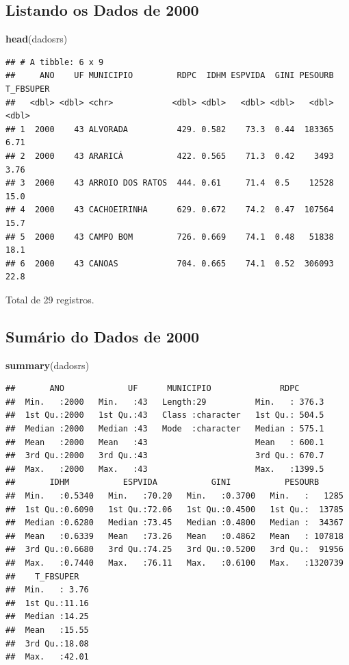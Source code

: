 \documentclass[]{article}
\newenvironment{Shaded}{\begin{snugshade}}{\end{snugshade}}
\newcommand{\KeywordTok}[1]{\textcolor[rgb]{0.13,0.29,0.53}{\textbf{#1}}}
\newcommand{\NormalTok}[1]{#1}
\begin{document}
\subsection{Listando os Dados de 2000}\label{listando-os-dados-de-2000}

\begin{Shaded}
\begin{Highlighting}[]
\KeywordTok{head}\NormalTok{(dadosrs)}
\end{Highlighting}
\end{Shaded}

\begin{verbatim}
## # A tibble: 6 x 9
##     ANO    UF MUNICIPIO         RDPC  IDHM ESPVIDA  GINI PESOURB T_FBSUPER
##   <dbl> <dbl> <chr>            <dbl> <dbl>   <dbl> <dbl>   <dbl>     <dbl>
## 1  2000    43 ALVORADA          429. 0.582    73.3  0.44  183365      6.71
## 2  2000    43 ARARICÁ           422. 0.565    71.3  0.42    3493      3.76
## 3  2000    43 ARROIO DOS RATOS  444. 0.61     71.4  0.5    12528     15.0 
## 4  2000    43 CACHOEIRINHA      629. 0.672    74.2  0.47  107564     15.7 
## 5  2000    43 CAMPO BOM         726. 0.669    74.1  0.48   51838     18.1 
## 6  2000    43 CANOAS            704. 0.665    74.1  0.52  306093     22.8
\end{verbatim}

Total de 29 registros.

\subsection{Sumário do Dados de 2000}\label{sumario-do-dados-de-2000}

\begin{Shaded}
\begin{Highlighting}[]
\KeywordTok{summary}\NormalTok{(dadosrs)}
\end{Highlighting}
\end{Shaded}

\begin{verbatim}
##       ANO             UF      MUNICIPIO              RDPC       
##  Min.   :2000   Min.   :43   Length:29          Min.   : 376.3  
##  1st Qu.:2000   1st Qu.:43   Class :character   1st Qu.: 504.5  
##  Median :2000   Median :43   Mode  :character   Median : 575.1  
##  Mean   :2000   Mean   :43                      Mean   : 600.1  
##  3rd Qu.:2000   3rd Qu.:43                      3rd Qu.: 670.7  
##  Max.   :2000   Max.   :43                      Max.   :1399.5  
##       IDHM           ESPVIDA           GINI           PESOURB       
##  Min.   :0.5340   Min.   :70.20   Min.   :0.3700   Min.   :   1285  
##  1st Qu.:0.6090   1st Qu.:72.06   1st Qu.:0.4500   1st Qu.:  13785  
##  Median :0.6280   Median :73.45   Median :0.4800   Median :  34367  
##  Mean   :0.6339   Mean   :73.26   Mean   :0.4862   Mean   : 107818  
##  3rd Qu.:0.6680   3rd Qu.:74.25   3rd Qu.:0.5200   3rd Qu.:  91956  
##  Max.   :0.7440   Max.   :76.11   Max.   :0.6100   Max.   :1320739  
##    T_FBSUPER    
##  Min.   : 3.76  
##  1st Qu.:11.16  
##  Median :14.25  
##  Mean   :15.55  
##  3rd Qu.:18.08  
##  Max.   :42.01
\end{verbatim}
\end{document}

